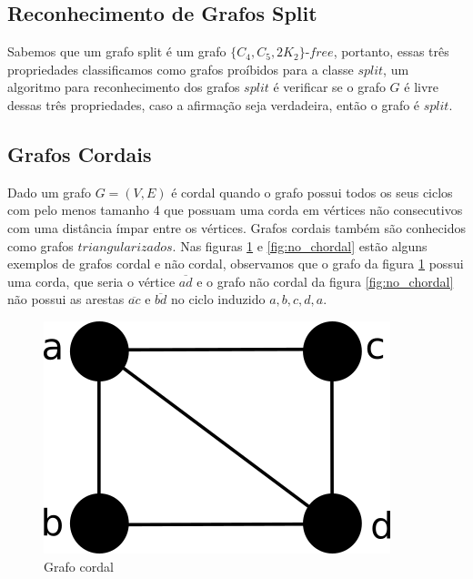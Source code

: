\subsection{Reconhecimento de Grafos Split}

Sabemos que um grafo split é um grafo $\{C_4, C_5, 2K_2\}$-$free$, portanto, essas três propriedades classificamos como grafos proíbidos para a classe $split$, um algoritmo para reconhecimento dos grafos $split$ é verificar se o grafo $G$ é livre dessas três propriedades, caso a afirmação seja verdadeira, então o grafo é $split$.

\subsection{Grafos Cordais}

Dado um grafo $G = (V, E)$ é cordal quando o grafo possui todos os seus ciclos com pelo menos tamanho 4 que possuam uma corda em vértices não consecutivos com uma distância ímpar entre os vértices. Grafos cordais também são conhecidos como grafos $triangularizados$. Nas figuras \ref{fig:chordal_1} e \ref{fig:no_chordal} estão alguns exemplos de grafos cordal e não cordal, observamos que o grafo da figura \ref{fig:chordal_1} possui uma corda, que seria o vértice $\overline{ad}$ e o grafo não cordal da figura \ref{fig:no_chordal} não possui as arestas $\overline{ac}$ e $\overline{bd}$ no ciclo induzido $a, b, c, d, a$.

\begin{figure}
    \centering
    \includegraphics[scale=0.4]{pictures/path55.png}
    \caption{Grafo cordal}
    \label{fig:chordal_1}
\end{figure}


